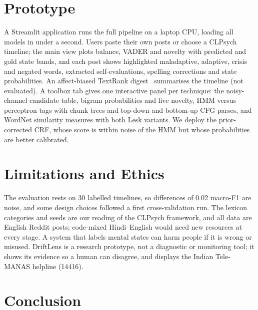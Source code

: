 \documentclass[conference]{IEEEtran}
\begin{document}
\section{Prototype}

A Streamlit application runs the full pipeline on a laptop CPU, loading all models in under a second. Users paste their own posts or choose a CLPsych timeline; the main view plots balance, VADER and novelty with predicted and gold state bands, and each post shows highlighted maladaptive, adaptive, crisis and negated words, extracted self-evaluations, spelling corrections and state probabilities. An affect-biased TextRank digest~\cite{mihalcea2004textrank} summarises the timeline (not evaluated). A toolbox tab gives one interactive panel per technique: the noisy-channel candidate table, bigram probabilities and live novelty, HMM versus perceptron tags with chunk trees and top-down and bottom-up CFG parses, and WordNet similarity measures with both Lesk variants. We deploy the prior-corrected CRF, whose score is within noise of the HMM but whose probabilities are better calibrated.

\section{Limitations and Ethics}

The evaluation rests on 30 labelled timelines, so differences of 0.02 macro-F1 are noise, and some design choices followed a first cross-validation run. The lexicon categories and seeds are our reading of the CLPsych framework, and all data are English Reddit posts; code-mixed Hindi--English would need new resources at every stage. A system that labels mental states can harm people if it is wrong or misused. DriftLens is a research prototype, not a diagnostic or monitoring tool; it shows its evidence so a human can disagree, and displays the Indian Tele-MANAS helpline (14416).

\section{Conclusion}
\end{document}
